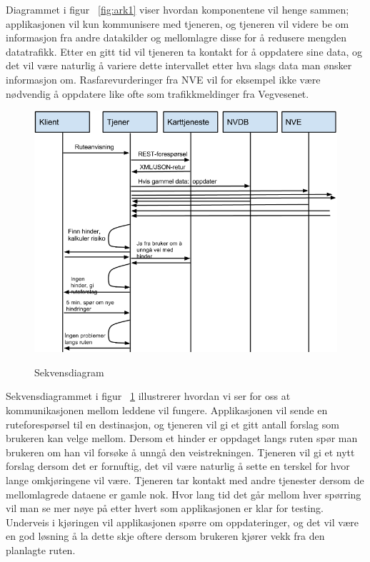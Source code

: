 \documentclass[a4paper,norsk,oneside]{book}
\begin{document}
Diagrammet i figur ~\ref{fig:ark1} viser hvordan komponentene vil henge sammen; applikasjonen vil kun kommunisere med tjeneren, og tjeneren vil videre be om informasjon fra andre datakilder og mellomlagre disse for å redusere mengden datatrafikk. Etter en gitt tid vil tjeneren ta kontakt for å oppdatere sine data, og det vil være naturlig å variere dette intervallet etter hva slags data man ønsker informasjon om. Rasfarevurderinger fra NVE vil for eksempel ikke være nødvendig å oppdatere like ofte som trafikkmeldinger fra Vegvesenet.

\begin{figure}[H]
\centering
\includegraphics[scale=0.5]{figs/Sekvensdiagram.png}
\label{fig:sekvensdiagram}
\caption{Sekvensdiagram}
\end{figure}

Sekvensdiagrammet i figur ~\ref{fig:sekvensdiagram} illustrerer hvordan vi ser for oss at kommunikasjonen mellom leddene vil fungere. Applikasjonen vil sende en ruteforespørsel til en destinasjon, og tjeneren vil gi et gitt antall forslag som brukeren kan velge mellom. Dersom et hinder er oppdaget langs ruten spør man brukeren om han vil forsøke å unngå den veistrekningen. Tjeneren vil gi et nytt forslag dersom det er fornuftig, det vil være naturlig å sette en terskel for hvor lange omkjøringene vil være.
Tjeneren tar kontakt med andre tjenester dersom de mellomlagrede dataene er gamle nok. Hvor lang tid det går mellom hver spørring vil man se mer nøye på etter hvert som applikasjonen er klar for testing.
Underveis i kjøringen vil applikasjonen spørre om oppdateringer, og det vil være en god løsning å la dette skje oftere dersom brukeren kjører vekk fra den planlagte ruten.
\end{document}
